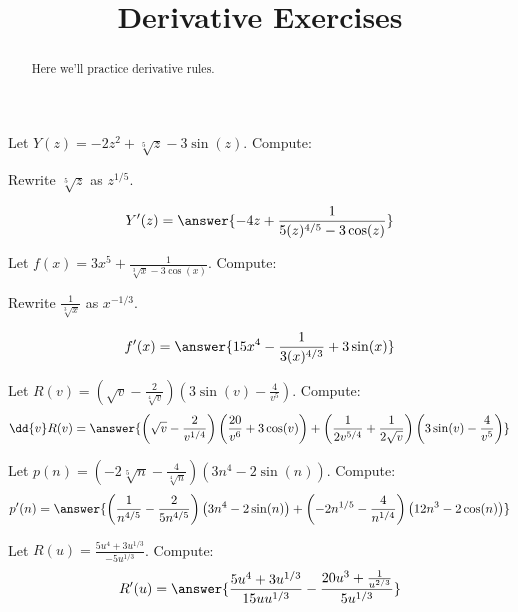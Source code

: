 \documentclass[handout]{ximera}
\title{Derivative Exercises}
\begin{document}
\begin{abstract}
  Here we'll practice derivative rules.
\end{abstract}
\maketitle

\begin{exercise}
Let $Y(z) = -2 z^2 + \sqrt[5]{z} -3 \sin (z)$. Compute:

\begin{hint}
Rewrite $\sqrt[5]{z}$ as $z^{1/5}$.
\end{hint}

\[
Y'(z)
=\answer{-4z+\frac{1}{5 (z)^{4/5}-3 \cos(z)}}
\]
\end{exercise}


\begin{exercise}
Let $f(x) = 3x^5+\frac{1}{\sqrt[3]{x}-3 \cos (x)}$. Compute:

\begin{hint}
Rewrite $\frac{1}{\sqrt[3]{x}}$ as $x^{-1/3}$.
\end{hint}
\[
f'(x)
=\answer{15x^4-\frac{1}{3 (x)^{4/3}}+3 \sin(x)}
\]
\end{exercise}

\begin{exercise}
Let $R(v) = \left(\sqrt{v}-\frac{2}{\sqrt[4]{v}}\right) \left(3 \sin (v)-\frac{4}{v^5}\right)$. Compute:
\[
\dd{v}R(v)
=\answer{\left(\sqrt{v}-\frac{2}{{v}^{1/4}}\right) \left(\frac{20}{v^6}+3 \cos (v)\right) + \left(\frac{1}{2 {v}^{5/4}}+\frac{1}{2 \sqrt{v}}\right) \left(3 \sin (v)-\frac{4}{v^5}\right)}
\]
\end{exercise}

\begin{exercise}
Let $p(n) = \left(-2 \sqrt[5]{n}-\frac{4}{\sqrt[4]{n}}\right) \left(3 n^4-2 \sin (n)\right)$. Compute:
\[
p'(n)
=\answer{\left(\frac{1}{{n}^{4/5}}-\frac{2}{5 {n}^{4/5}}\right) \left(3 n^4 - 2 \sin (n)\right)+\left(-2 {n}^{1/5}-\frac{4}{{n}^{1/4}}\right) \left(12 n^3 - 2 \cos (n)\right)}
\]
\end{exercise}

\begin{exercise}
Let $R(u) = \frac{5 u^4+3 {u}^{1/3}}{-5 {u}^{1/3}}$. Compute:
\[
R'(u)
=\answer{\frac{5 u^4 + 3 {u}^{1/3}}{15 u {u}^{1/3}}-\frac{20 u^3+\frac{1}{{u}^{2/3}}}{5 {u}^{1/3}}}
\]
\end{exercise}
\end{document}
